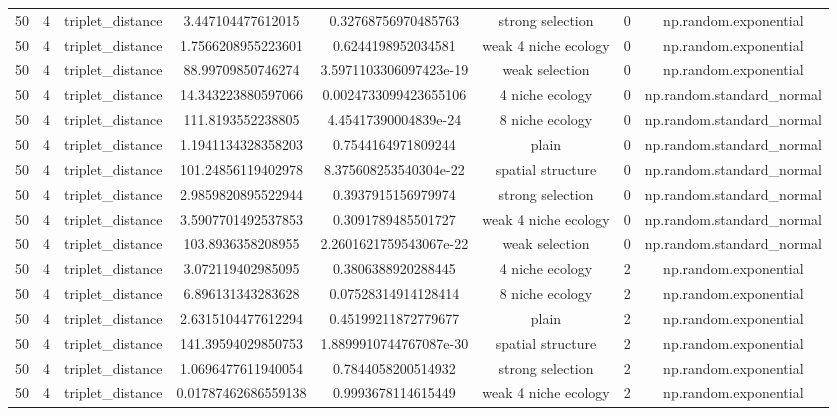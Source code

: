 \begin{longtable}{||c c c c c c c c||}
        50 & 4 & triplet\_distance & 3.447104477612015 & 0.32768756970485763 & strong selection & 0 & np.random.exponential \\ 
        50 & 4 & triplet\_distance & 1.7566208955223601 & 0.6244198952034581 & weak 4 niche ecology & 0 & np.random.exponential \\ 
        50 & 4 & triplet\_distance & 88.99709850746274 & 3.5971103306097423e-19 & weak selection & 0 & np.random.exponential \\ 
        50 & 4 & triplet\_distance & 14.343223880597066 & 0.0024733099423655106 & 4 niche ecology & 0 & np.random.standard\_normal \\ 
        50 & 4 & triplet\_distance & 111.8193552238805 & 4.45417390004839e-24 & 8 niche ecology & 0 & np.random.standard\_normal \\ 
        50 & 4 & triplet\_distance & 1.1941134328358203 & 0.7544164971809244 & plain & 0 & np.random.standard\_normal \\ 
        50 & 4 & triplet\_distance & 101.24856119402978 & 8.375608253540304e-22 & spatial structure & 0 & np.random.standard\_normal \\ 
        50 & 4 & triplet\_distance & 2.9859820895522944 & 0.3937915156979974 & strong selection & 0 & np.random.standard\_normal \\ 
        50 & 4 & triplet\_distance & 3.5907701492537853 & 0.3091789485501727 & weak 4 niche ecology & 0 & np.random.standard\_normal \\ 
        50 & 4 & triplet\_distance & 103.8936358208955 & 2.2601621759543067e-22 & weak selection & 0 & np.random.standard\_normal \\ 
        50 & 4 & triplet\_distance & 3.072119402985095 & 0.3806388920288445 & 4 niche ecology & 2 & np.random.exponential \\ 
        50 & 4 & triplet\_distance & 6.896131343283628 & 0.07528314914128414 & 8 niche ecology & 2 & np.random.exponential \\ 
        50 & 4 & triplet\_distance & 2.6315104477612294 & 0.45199211872779677 & plain & 2 & np.random.exponential \\ 
        50 & 4 & triplet\_distance & 141.39594029850753 & 1.8899910744767087e-30 & spatial structure & 2 & np.random.exponential \\ 
        50 & 4 & triplet\_distance & 1.0696477611940054 & 0.7844058200514932 & strong selection & 2 & np.random.exponential \\ 
        50 & 4 & triplet\_distance & 0.01787462686559138 & 0.9993678114615449 & weak 4 niche ecology & 2 & np.random.exponential \\ 

\end{longtable}
